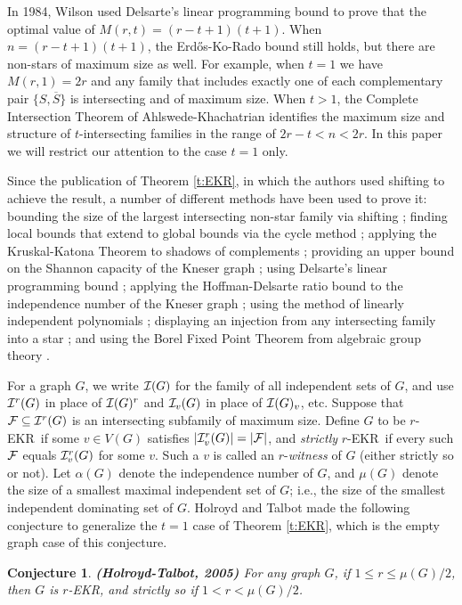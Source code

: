 \documentclass{article}
\newtheorem{cnj}[thm]{Conjecture}
\def\a{{\alpha}}
\def\m{{\mu}}
\def\cF{{\cal F}}
\def\cI{{\cal I}}
\def\oS{{\overline{S}}}
\def\ekr{{\sf EKR}}
\begin{document}
In 1984, Wilson \cite{Wilson} used Delsarte's linear programming bound \cite{Delsarte} to prove that the optimal value of $M(r,t)=(r-t+1)(t+1)$.
When $n=(r-t+1)(t+1)$, the Erd\H{o}s-Ko-Rado bound still holds, but there are non-stars of maximum size as well.
For example, when $t=1$ we have $M(r,1)=2r$ and any family that includes exactly one of each complementary pair $\{S,\oS\}$ is intersecting and of maximum size.
When $t>1$, the Complete Intersection Theorem of Ahlswede-Khachatrian \cite{AhlsKhac} identifies the maximum size and structure of $t$-intersecting families in the range of $2r-t<n<2r$.
In this paper we will restrict our attention to the case $t=1$ only.

Since the publication of Theorem \ref{t:EKR}, in which the authors used shifting to achieve the result, a number of different methods have been used to prove it: 
bounding the size of the largest intersecting non-star family via shifting \cite{HiltMiln}; 
finding local bounds that extend to global bounds via the cycle method \cite{Katona}; 
applying the Kruskal-Katona Theorem to shadows of complements \cite{Daykin,KatonaShadInt}; 
providing an upper bound on the Shannon capacity of the Kneser graph \cite{Lovasz}; 
using Delsarte's linear programming bound \cite{Wilson}; applying the Hoffman-Delsarte ratio bound to the independence number of the Kneser graph \cite{GodsMeag}; 
using the method of linearly independent polynomials \cite{FurHwaWei}; 
displaying an injection from any intersecting family into a star \cite{FranFure,HurlKamaInject};
and using the Borel Fixed Point Theorem from algebraic group theory \cite{WoodroofeAlg}.

For a graph $G$, we write $\cI(G)$ for the family of all independent sets of $G$, and use $\cI^r(G)$ in place of $\cI(G)^r$ and $\cI_v(G)$ in place of $\cI(G)_v$, etc.
Suppose that $\cF\subseteq\cI^r(G)$ is an intersecting subfamily of maximum size.
Define $G$ to be $r$-\ekr\ if some $v\in V(G)$ satisfies $|\cI^r_v(G)|=|\cF|$, and {\it strictly} $r$-\ekr\ if every such $\cF$ equals $\cI_v^r(G)$ for some $v$.
Such a $v$ is called an $r$-{\it witness} of $G$ (either strictly so or not).
Let $\a(G)$ denote the independence number of $G$, and $\m(G)$ denote the size of a smallest maximal independent set of $G$; i.e., the size of the smallest independent dominating set of $G$.
Holroyd and Talbot \cite{HolrTalb} made the following conjecture to generalize the $t=1$ case of Theorem \ref{t:EKR}, which is the empty graph case of this conjecture.

\begin{cnj}
\label{j:HolTal}
{\bf (Holroyd-Talbot, 2005)}
For any graph $G$, if $1\leq r\leq \m(G)/2$, then $G$ is $r$-\ekr, and strictly so if $1<r<\m(G)/2$.
\end{cnj}
\end{document}
